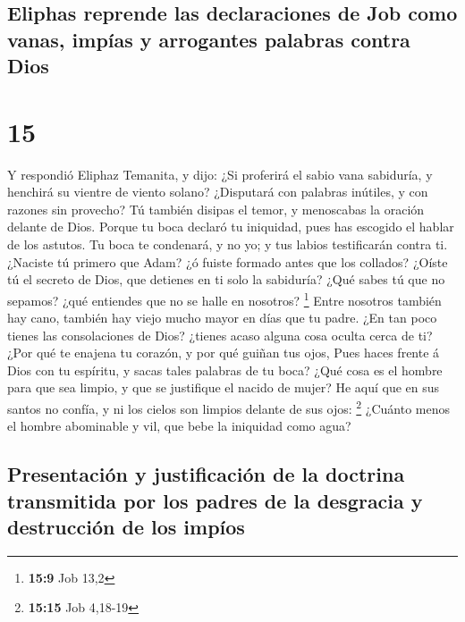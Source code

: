 \hypertarget{eliphas-reprende-las-declaraciones-de-job-como-vanas-impuxedas-y-arrogantes-palabras-contra-dios}{%
\subsection{Eliphas reprende las declaraciones de Job como vanas, impías
y arrogantes palabras contra
Dios}\label{eliphas-reprende-las-declaraciones-de-job-como-vanas-impuxedas-y-arrogantes-palabras-contra-dios}}

\hypertarget{section-14}{%
\section{15}\label{section-14}}

 Y respondió Eliphaz Temanita, y dijo:  ¿Si
proferirá el sabio vana sabiduría, y henchirá su vientre de viento
solano?  ¿Disputará con palabras inútiles, y con razones
sin provecho?  Tú también disipas el temor, y menoscabas
la oración delante de Dios.  Porque tu boca declaró tu
iniquidad, pues has escogido el hablar de los astutos.  Tu
boca te condenará, y no yo; y tus labios testificarán contra ti.
 ¿Naciste tú primero que Adam? ¿ó fuiste formado antes que
los collados?  ¿Oíste tú el secreto de Dios, que detienes
en ti solo la sabiduría?  ¿Qué sabes tú que no sepamos?
¿qué entiendes que no se halle en nosotros? \footnote{\textbf{15:9} Job
  13,2}  Entre nosotros también hay cano, también hay
viejo mucho mayor en días que tu padre.  ¿En tan poco
tienes las consolaciones de Dios? ¿tienes acaso alguna cosa oculta cerca
de ti?  ¿Por qué te enajena tu corazón, y por qué guiñan
tus ojos,  Pues haces frente á Dios con tu espíritu, y
sacas tales palabras de tu boca?  ¿Qué cosa es el hombre
para que sea limpio, y que se justifique el nacido de mujer?
 He aquí que en sus santos no confía, y ni los cielos son
limpios delante de sus ojos: \footnote{\textbf{15:15} Job 4,18-19}
 ¿Cuánto menos el hombre abominable y vil, que bebe la
iniquidad como agua?

\hypertarget{presentaciuxf3n-y-justificaciuxf3n-de-la-doctrina-transmitida-por-los-padres-de-la-desgracia-y-destrucciuxf3n-de-los-impuxedos}{%
\subsection{Presentación y justificación de la doctrina transmitida por
los padres de la desgracia y destrucción de los
impíos}\label{presentaciuxf3n-y-justificaciuxf3n-de-la-doctrina-transmitida-por-los-padres-de-la-desgracia-y-destrucciuxf3n-de-los-impuxedos}}

